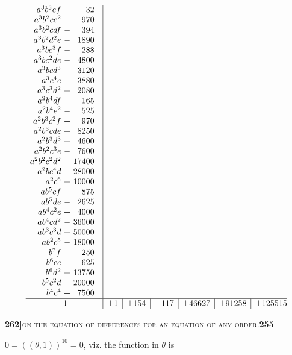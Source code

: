 \[\begin{array}{@{}c|c|c|c|c|c|c@{}}
\begin{array}{r@{\ }c@{\ }r}
a^3b^3ef&+&32\\
a^3b^2ce^2&+&970\\
a^3b^2cdf&-&394\\
a^3b^2d^2e&-&1890\\
a^3bc^3f&-&288\\
a^3bc^2de&-&4800\\
a^3bcd^3&-&3120\\
a^3c^4e&+&3880\\
a^3c^3d^2&+&2080\\
a^2b^4df&+&165\\
a^2b^4e^2&-&525\\
a^2b^3c^2f&+&970\\
a^2b^3cde&+&8250\\
a^2b^3d^3&+&4600\\
a^2b^2c^3e&-&7600\\
a^2b^2c^2d^2&+&17400\\
a^2bc^4d&-&28000\\
a^2c^6&+&10000\\
ab^5cf&-&875\\
ab^5de&-&2625\\
ab^4c^2e&+&4000\\
ab^4cd^2&-&36000\\
ab^3c^3d&+&50000\\
ab^2c^5&-&18000\\
b^7f&+&250\\
b^6ce&-&625\\
b^6d^2&+&13750\\
b^5c^2d&-&20000\\
b^4c^4&+&7500
\end{array}
\\
\hline
\pm1 & \pm1 & \pm154 & \pm117 & \pm46627 & \pm91258 & \pm125515
\end{array}
\]
\endgroup

\newpage
\setcounter{page}{255}

\noindent\textbf{262]}\hfill\textsc{on the equation of differences for an equation of any order.}\hfill\textbf{255}

\medskip

\noindent $0=((\theta,1))^{10}=0$, viz. the function in $\theta$ is

